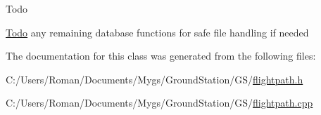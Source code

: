\begin{DoxyRefDesc}{Todo}
\item[\hyperlink{todo__todo000008}{Todo}]any remaining database functions for safe file handling if needed \end{DoxyRefDesc}


The documentation for this class was generated from the following files\+:\begin{DoxyCompactItemize}
\item 
C\+:/\+Users/\+Roman/\+Documents/\+Mygs/\+Ground\+Station/\+G\+S/\hyperlink{flightpath_8h}{flightpath.\+h}\item 
C\+:/\+Users/\+Roman/\+Documents/\+Mygs/\+Ground\+Station/\+G\+S/\hyperlink{flightpath_8cpp}{flightpath.\+cpp}\end{DoxyCompactItemize}
